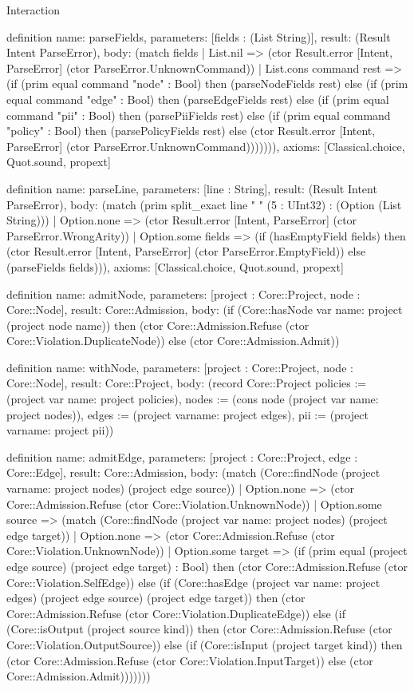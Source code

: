 \begin{lexlean}{Interaction}
\begin{semanticmodule}
definition{
  name: parseFields,
  parameters: [fields : (List String)],
  result: (Result Intent ParseError),
  body: (match fields
    | List.nil => (ctor Result.error [Intent, ParseError] (ctor ParseError.UnknownCommand))
    | List.cons command rest => (if (prim equal command "node" : Bool) then (parseNodeFields rest) else (if (prim equal command "edge" : Bool) then (parseEdgeFields rest) else (if (prim equal command "pii" : Bool) then (parsePiiFields rest) else (if (prim equal command "policy" : Bool) then (parsePolicyFields rest) else (ctor Result.error [Intent, ParseError] (ctor ParseError.UnknownCommand))))))),
  axioms: [Classical.choice, Quot.sound, propext]
}

definition{
  name: parseLine,
  parameters: [line : String],
  result: (Result Intent ParseError),
  body: (match (prim split_exact line " " (5 : UInt32) : (Option (List String)))
    | Option.none => (ctor Result.error [Intent, ParseError] (ctor ParseError.WrongArity))
    | Option.some fields => (if (hasEmptyField fields) then (ctor Result.error [Intent, ParseError] (ctor ParseError.EmptyField)) else (parseFields fields))),
  axioms: [Classical.choice, Quot.sound, propext]
}

definition{
  name: admitNode,
  parameters: [project : Core::Project, node : Core::Node],
  result: Core::Admission,
  body: (if (Core::hasNode var{
    name: project
  } (project node name)) then (ctor Core::Admission.Refuse (ctor Core::Violation.DuplicateNode)) else (ctor Core::Admission.Admit))
}

definition{
  name: withNode,
  parameters: [project : Core::Project, node : Core::Node],
  result: Core::Project,
  body: (record Core::Project {policies := (project var{
    name: project
  } policies), nodes := (cons node (project var{
    name: project
  } nodes)), edges := (project var{name: project} edges), pii := (project var{name: project} pii)})
}

definition{
  name: admitEdge,
  parameters: [project : Core::Project, edge : Core::Edge],
  result: Core::Admission,
  body: (match (Core::findNode (project var{name: project} nodes) (project edge source))
    | Option.none => (ctor Core::Admission.Refuse (ctor Core::Violation.UnknownNode))
    | Option.some source => (match (Core::findNode (project var{
        name: project
      } nodes) (project edge target))
      | Option.none => (ctor Core::Admission.Refuse (ctor Core::Violation.UnknownNode))
      | Option.some target => (if (prim equal (project edge source) (project edge target) : Bool) then (ctor Core::Admission.Refuse (ctor Core::Violation.SelfEdge)) else (if (Core::hasEdge (project var{
        name: project
      } edges) (project edge source) (project edge target)) then (ctor Core::Admission.Refuse (ctor Core::Violation.DuplicateEdge)) else (if (Core::isOutput (project source kind)) then (ctor Core::Admission.Refuse (ctor Core::Violation.OutputSource)) else (if (Core::isInput (project target kind)) then (ctor Core::Admission.Refuse (ctor Core::Violation.InputTarget)) else (ctor Core::Admission.Admit)))))))
}


\end{semanticmodule}
\end{lexlean}
